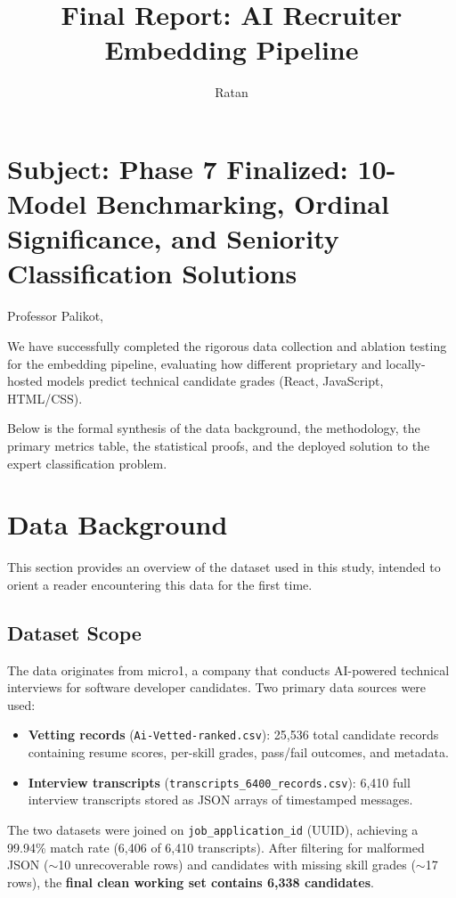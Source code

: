 \documentclass[11pt]{article}
\title{Final Report: AI Recruiter Embedding Pipeline}
\author{Ratan}
\date{}
\begin{document}
\maketitle

\section*{Subject: Phase 7 Finalized: 10-Model Benchmarking, Ordinal Significance, and Seniority Classification Solutions}

Professor Palikot,

We have successfully completed the rigorous data collection and ablation testing for the embedding pipeline, evaluating how different proprietary and locally-hosted models predict technical candidate grades (React, JavaScript, HTML/CSS). 

Below is the formal synthesis of the data background, the methodology, the primary metrics table, the statistical proofs, and the deployed solution to the expert classification problem.

\section{Data Background}

This section provides an overview of the dataset used in this study, intended to orient a reader encountering this data for the first time.

\subsection{Dataset Scope}

The data originates from micro1, a company that conducts AI-powered technical interviews for software developer candidates. Two primary data sources were used:

\begin{itemize}
    \item \textbf{Vetting records} (\texttt{Ai-Vetted-ranked.csv}): 25,536 total candidate records containing resume scores, per-skill grades, pass/fail outcomes, and metadata.
    \item \textbf{Interview transcripts} (\texttt{transcripts\_6400\_records.csv}): 6,410 full interview transcripts stored as JSON arrays of timestamped messages.
\end{itemize}

The two datasets were joined on \texttt{job\_application\_id} (UUID), achieving a 99.94\% match rate (6,406 of 6,410 transcripts). After filtering for malformed JSON ($\sim$10 unrecoverable rows) and candidates with missing skill grades ($\sim$17 rows), the \textbf{final clean working set contains 6,338 candidates}.
\end{document}
